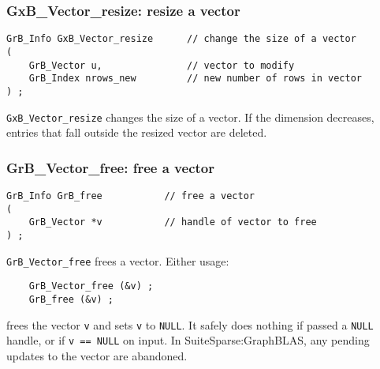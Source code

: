 \documentclass[12pt]{article}
\begin{document}
\newpage
\subsubsection{{\sf GxB\_Vector\_resize:}          resize a vector}
\label{vector_resize}

\begin{mdframed}[userdefinedwidth=6in]
{\footnotesize
\begin{verbatim}
GrB_Info GxB_Vector_resize      // change the size of a vector
(
    GrB_Vector u,               // vector to modify
    GrB_Index nrows_new         // new number of rows in vector
) ;
\end{verbatim} } \end{mdframed}

\verb'GxB_Vector_resize' changes the size of a vector.  If the dimension
decreases, entries that fall outside the resized vector are deleted.

\subsubsection{{\sf GrB\_Vector\_free:}          free a vector}
\label{vector_free}

\begin{mdframed}[userdefinedwidth=6in]
{\footnotesize
\begin{verbatim}
GrB_Info GrB_free           // free a vector
(
    GrB_Vector *v           // handle of vector to free
) ;
\end{verbatim}
} \end{mdframed}

\verb'GrB_Vector_free' frees a vector.  Either usage:

    {\small
    \begin{verbatim}
    GrB_Vector_free (&v) ;
    GrB_free (&v) ; \end{verbatim}}

\noindent
frees the vector \verb'v' and sets \verb'v' to \verb'NULL'.  It safely does
nothing if passed a \verb'NULL' handle, or if \verb'v == NULL' on input.
In SuiteSparse:GraphBLAS, any pending updates to the vector are abandoned.


\newpage
\end{document}
